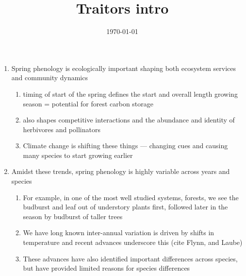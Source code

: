 \documentclass{article}
\begin{document}
\title{Traitors intro}
\date{\today}

\maketitle 


\begin{enumerate}
\item Spring phenology is ecologically important shaping both ecosystem services and community dynamics %
\begin{enumerate}
\item timing of start of the spring defines the start and overall length growing season = potential for forest carbon storage
\item also shapes competitive interactions and the abundance and identity of herbivores and pollinators 
\item Climate change is shifting these things --- changing cues and causing many species to start growing earlier
\end{enumerate}

\item Amidst these trends, spring phenology is highly variable across years and species %
\begin{enumerate}
\item For example, in one of the most well studied systems, forests, we see the budburst and leaf out of understory plants first, followed later in the season by budburst of taller trees
\item We have long known inter-annual variation is driven by shifts in temperature and recent advances underscore this (cite Flynn, and Laube)
\item These advances have also identified important differences across species, but have provided limited reasons for species differences
\end{enumerate} 


\end{enumerate}
\end{document}
